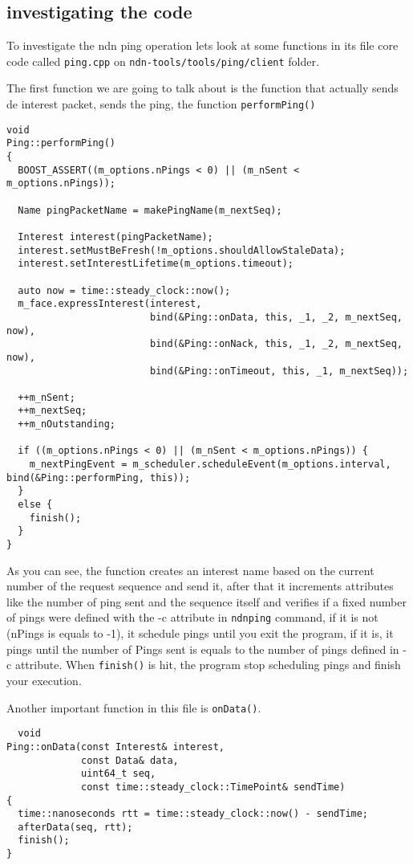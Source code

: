 \documentclass[11pt,conference]{./IEEEtran}
\begin{document}
\subsection{investigating the code}
To investigate the ndn ping operation lets look at some functions in its file core code called \texttt{ping.cpp} on \texttt{ndn-tools/tools/ping/client} folder. \par The first function we are going to talk about is the function that actually sends de interest packet, sends the ping, the function \texttt{performPing()}
\clearpage
\begin{lstlisting}
void
Ping::performPing()
{
  BOOST_ASSERT((m_options.nPings < 0) || (m_nSent < m_options.nPings));

  Name pingPacketName = makePingName(m_nextSeq);

  Interest interest(pingPacketName);
  interest.setMustBeFresh(!m_options.shouldAllowStaleData);
  interest.setInterestLifetime(m_options.timeout);

  auto now = time::steady_clock::now();
  m_face.expressInterest(interest,
                         bind(&Ping::onData, this, _1, _2, m_nextSeq, now),
                         bind(&Ping::onNack, this, _1, _2, m_nextSeq, now),
                         bind(&Ping::onTimeout, this, _1, m_nextSeq));

  ++m_nSent;
  ++m_nextSeq;
  ++m_nOutstanding;

  if ((m_options.nPings < 0) || (m_nSent < m_options.nPings)) {
    m_nextPingEvent = m_scheduler.scheduleEvent(m_options.interval, bind(&Ping::performPing, this));
  }
  else {
    finish();
  }
}

\end{lstlisting}
As you can see, the function creates an interest name based on the current number of the request sequence and send it, after that it increments attributes like the number of ping sent and the sequence itself and verifies if a fixed number of pings were defined with the -c attribute in \texttt{ndnping} command, if it is not (nPings is equals to -1), it schedule pings until you exit the program, if it is, it pings until the number of Pings sent is equals to the number of pings defined in -c attribute. When \texttt{finish()} is hit, the program stop scheduling pings and finish your execution.\par
Another important function in this file is \texttt{onData()}.
\begin{lstlisting}
  void
Ping::onData(const Interest& interest,
             const Data& data,
             uint64_t seq,
             const time::steady_clock::TimePoint& sendTime)
{
  time::nanoseconds rtt = time::steady_clock::now() - sendTime;
  afterData(seq, rtt);
  finish();
}
\end{lstlisting}
\end{document}
